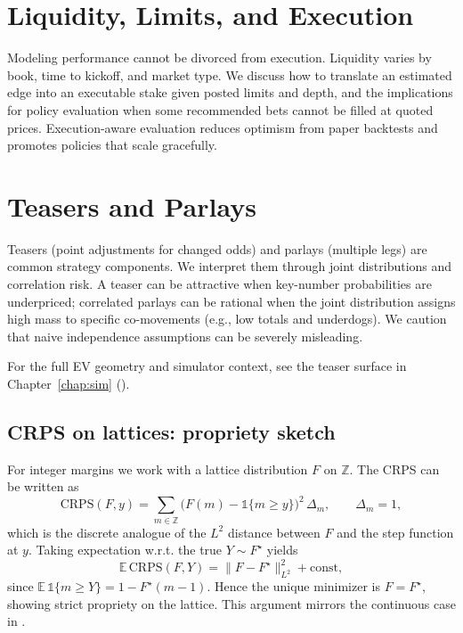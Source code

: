 \section{Liquidity, Limits, and Execution}
Modeling performance cannot be divorced from execution. Liquidity varies by book, time to kickoff, and market type. We discuss how to translate an estimated edge into an executable stake given posted limits and depth, and the implications for policy evaluation when some recommended bets cannot be filled at quoted prices. Execution-aware evaluation reduces optimism from paper backtests and promotes policies that scale gracefully.

\section{Teasers and Parlays}
Teasers (point adjustments for changed odds) and parlays (multiple legs) are common strategy components. We interpret them through joint distributions and correlation risk. A teaser can be attractive when key-number probabilities are underpriced; correlated parlays can be rational when the joint distribution assigns high mass to specific co-movements (e.g., low totals and underdogs). We caution that naive independence assumptions can be severely misleading.

For the full EV geometry and simulator context, see the teaser surface in Chapter~\ref{chap:sim} ().
\subsection{CRPS on lattices: propriety sketch}\label{subsec:crps-lattice}
For integer margins we work with a lattice distribution $F$ on $\mathbb Z$. The CRPS can be written as
\begin{equation}
\mathrm{CRPS}(F,y)=\sum_{m\in\mathbb Z} \big(F(m)-\mathbb 1\{m\ge y\}\big)^2\,\Delta_m,\qquad \Delta_m=1,
\end{equation}
which is the discrete analogue of the $L^2$ distance between $F$ and the step function at $y$. Taking expectation w.r.t. the true $Y\sim F^\star$ yields
\[\mathbb E\,\mathrm{CRPS}(F,Y)= \|F-F^\star\|_{L^2}^2 + \text{const},\]
since $\mathbb E\,\mathbb 1\{m\ge Y\}=1-F^\star(m-1)$. Hence the unique minimizer is $F=F^\star$, showing strict propriety on the lattice. This argument mirrors the continuous case in .

